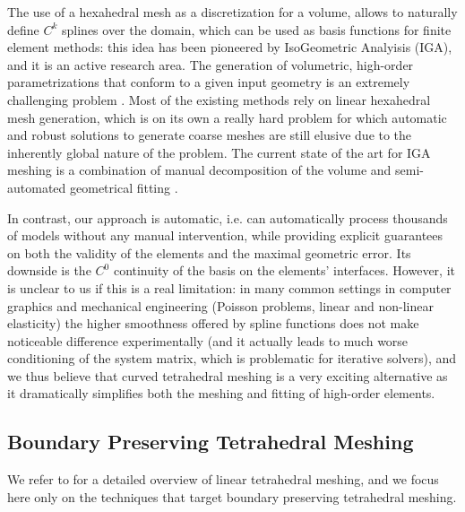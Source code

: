 The use of a hexahedral mesh as a discretization for a volume, allows to naturally define $C^k$ splines over the domain, which can be used as basis functions for finite element methods: this idea has been pioneered by 
IsoGeometric Analyisis (IGA), and it is an active research area. The generation of volumetric, high-order parametrizations that conform to a given input geometry is an extremely challenging problem \cite{Sorger:2014,Peir2015OnCH}. Most of the existing methods rely on linear hexahedral mesh generation, which is on its own a really hard problem for which automatic and robust solutions to generate coarse meshes are still elusive \cite{Yufei:2012,Gao:2019,Guo2020Cut,Palmer:2020,Zhang:2020,marschner2020hexahedral} due to the inherently global nature of the problem. 
%
The current state of the art for IGA meshing is a combination of manual decomposition of the volume and semi-automated geometrical fitting \cite{yu2020hexgen,coreform}.

In contrast, our approach is automatic, i.e. can automatically process thousands of models without any manual intervention, while providing explicit guarantees on both the validity of the elements and the maximal geometric error. Its downside is the $C^0$ continuity of the basis on the elements' interfaces. However, it is unclear to us if this is a real limitation: in many common settings in computer graphics and mechanical engineering (Poisson problems, linear and non-linear elasticity) the higher smoothness offered by spline functions does not make noticeable difference experimentally \cite{schneider2019large} (and it actually leads to much worse conditioning of the system matrix, which is problematic for iterative solvers), and we thus believe that curved tetrahedral meshing is a very exciting alternative as it dramatically simplifies both the meshing and fitting of high-order elements.

\subsection{Boundary Preserving Tetrahedral Meshing}
\label{cumin:sec:rel:linear}

We refer to \cite{hu2018tetrahedral} for a detailed overview of linear tetrahedral meshing, and we focus here only on the techniques that target boundary preserving tetrahedral meshing. 

